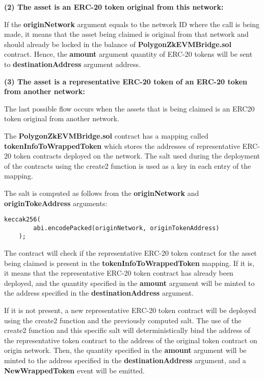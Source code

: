 \textbf{(2) The asset is an ERC-20 token original from this network:}
	
If the \textbf{originNetwork} argument equals to the network ID where the call is being made, it means that the asset being claimed is original from that network and should already be locked in the balance of \textbf{PolygonZkEVMBridge.sol} contract. Hence, the \textbf{amount} argument quantity of ERC-20 tokens will be sent to \textbf{destinationAddress} argument address.

	
\textbf{(3) The asset is a representative ERC-20 token of an ERC-20 token from another network:}
	
The last possible flow occurs when the assets that is being claimed is an ERC20 token original from another network.

The \textbf{PolygonZkEVMBridge.sol} contract has a mapping called \textbf{tokenInfoToWrappedToken} which stores the addresses of representative ERC-20 token contracts deployed on the network. The salt used during the deployment of the contracts using the create2 function is used as a key in each entry of the mapping.
	
The salt is computed as follows from the \textbf{originNetwork} and \textbf{originTokeAddress} arguments:
	
\begin{lstlisting}[language= Solidity]
	keccak256(
		abi.encodePacked(originNetwork, originTokenAddress)
	);
\end{lstlisting}
	
The contract will check if the representative ERC-20 token contract for the asset being claimed is present in the \textbf{tokenInfoToWrappedToken} mapping. If it is, it means that the representative ERC-20 token contract has already been deployed, and the quantity specified in the \textbf{amount} argument will be minted to the address specified in the \textbf{destinationAddress} argument.
	
If it is not present, a new representative ERC-20 token contract will be deployed using the create2 function and the previously computed salt. The use of the create2 function and this specific salt will deterministically bind the address of the representative token contract to the address of the original token contract on origin network. Then, the quantity specified in the \textbf{amount} argument will be minted to the address specified in the \textbf{destinationAddress} argument, and a \textbf{NewWrappedToken} event will be emitted. 
	
